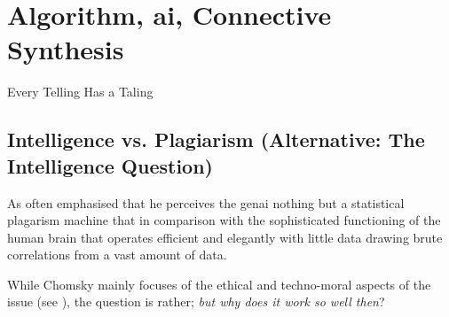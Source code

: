 \chapter{Algorithm, \gls{ai}, Connective Synthesis}\label{chap:Algorithm} %
\epigraph{Every Telling Has a Taling}{\textcite{joyce1975}}






\section{Intelligence vs. Plagiarism (Alternative: The Intelligence Question)}


As \citeauthor{chomsky2023} often emphasised that he perceives the \gls{genai}
nothing but a statistical plagarism machine that in comparison with the
sophisticated functioning of the human brain that operates efficient and
elegantly with little data drawing brute correlations from a vast amount of
data.

While Chomsky mainly focuses of the ethical and techno-moral aspects of
the issue (see \cite{montanari2025}), the question is rather; \emph{but why does it work so well then}?

